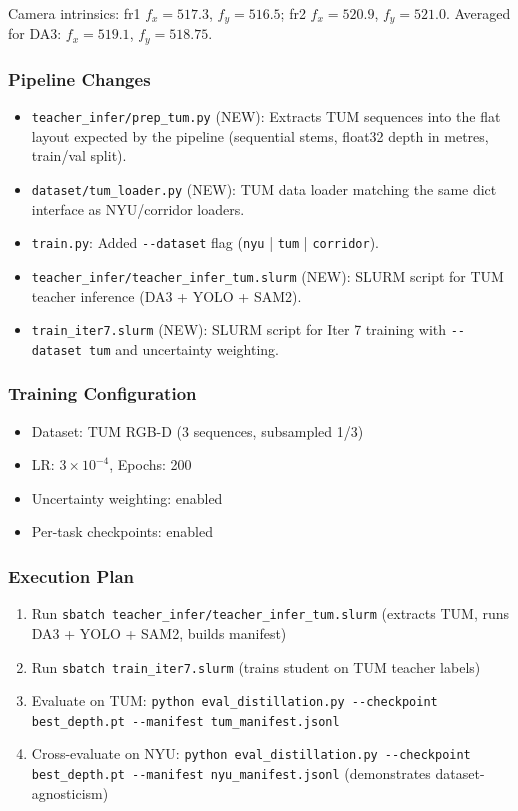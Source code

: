 \documentclass[11pt,a4paper]{article}
\begin{document}
Camera intrinsics: fr1 $f_x=517.3$, $f_y=516.5$; fr2 $f_x=520.9$,
$f_y=521.0$. Averaged for DA3: $f_x=519.1$, $f_y=518.75$.

\subsubsection{Pipeline Changes}

\begin{itemize}[nosep]
  \item \texttt{teacher\_infer/prep\_tum.py} (NEW): Extracts TUM sequences
    into the flat layout expected by the pipeline (sequential stems,
    float32 depth in metres, train/val split).
  \item \texttt{dataset/tum\_loader.py} (NEW): TUM data loader matching
    the same dict interface as NYU/corridor loaders.
  \item \texttt{train.py}: Added \texttt{-{}-dataset} flag
    (\texttt{nyu} | \texttt{tum} | \texttt{corridor}).
  \item \texttt{teacher\_infer/teacher\_infer\_tum.slurm} (NEW): SLURM
    script for TUM teacher inference (DA3 + YOLO + SAM2).
  \item \texttt{train\_iter7.slurm} (NEW): SLURM script for Iter 7
    training with \texttt{-{}-dataset tum} and uncertainty weighting.
\end{itemize}

\subsubsection{Training Configuration}

\begin{itemize}[nosep]
  \item Dataset: TUM RGB-D (3 sequences, subsampled 1/3)
  \item LR: $3 \times 10^{-4}$, Epochs: 200
  \item Uncertainty weighting: enabled
  \item Per-task checkpoints: enabled
\end{itemize}

\subsubsection{Execution Plan}

\begin{enumerate}[nosep]
  \item Run \texttt{sbatch teacher\_infer/teacher\_infer\_tum.slurm}
    (extracts TUM, runs DA3 + YOLO + SAM2, builds manifest)
  \item Run \texttt{sbatch train\_iter7.slurm}
    (trains student on TUM teacher labels)
  \item Evaluate on TUM: \texttt{python eval\_distillation.py
    -{}-checkpoint best\_depth.pt -{}-manifest tum\_manifest.jsonl}
  \item Cross-evaluate on NYU: \texttt{python eval\_distillation.py
    -{}-checkpoint best\_depth.pt -{}-manifest nyu\_manifest.jsonl}
    (demonstrates dataset-agnosticism)
\end{enumerate}
\end{document}
